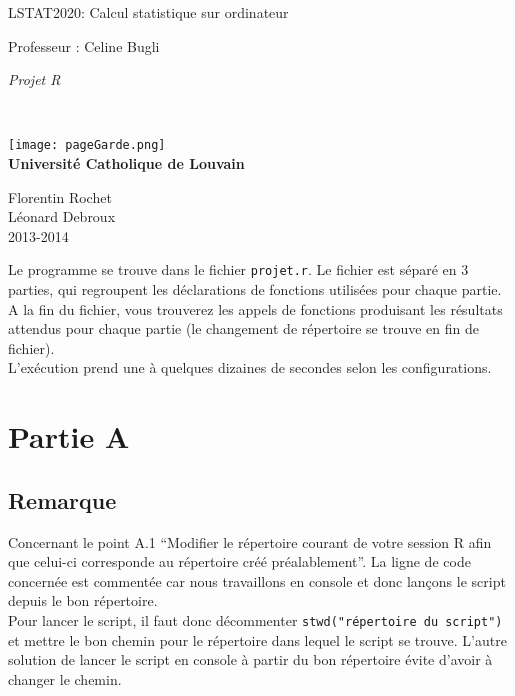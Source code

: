 \documentclass{article}
\begin{document}
\begin{titlepage}
    \begin{center}
        {\huge LSTAT2020: Calcul statistique sur ordinateur}\\
        \vspace{0.4cm}
        
        {\Large {Professeur : Celine Bugli}}\\
        \vspace{0.6cm}
        
        {\Large \textit{Projet R}}\\
        \vspace{1.2cm}

        \texttt{}\\
        \vspace{0.2cm}

        \texttt{[image: pageGarde.png]}\\
        \vspace{0.1cm}
        {\Large \textbf{Universit\'e Catholique de Louvain}}
        \vspace{0.7cm}

        \vspace{2cm}
        
        Florentin Rochet\\
        Léonard Debroux \\
        \vspace{0.2cm}
        2013-2014\\
    \end{center}
\end{titlepage}

Le programme se trouve dans le fichier \texttt{projet.r}. Le fichier est séparé en 3 parties, qui regroupent les déclarations de fonctions utilisées pour chaque partie. A la fin du fichier, vous trouverez les appels de fonctions produisant les résultats attendus pour chaque partie (le changement de répertoire se trouve en fin de fichier).\\
L'exécution prend une à quelques dizaines de secondes selon les configurations.

\section{Partie A}

\subsection{Remarque}
Concernant le point A.1 ``Modifier le répertoire courant de votre session R afin que celui-ci corresponde au répertoire créé préalablement''. La ligne de code concernée est commentée car nous travaillons en console et donc lançons le script depuis le bon répertoire.\\
Pour lancer le script, il faut donc décommenter \texttt{stwd("répertoire du script")} et mettre le bon chemin pour le répertoire dans lequel le script se trouve. L'autre solution de lancer le script en console à partir du bon répertoire évite d'avoir à changer le chemin.
\end{document}
